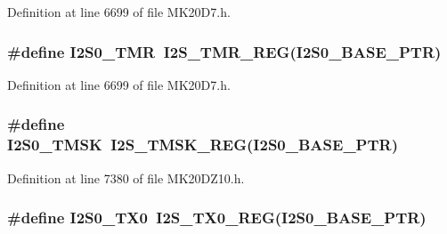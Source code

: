 Definition at line 6699 of file M\+K20\+D7.\+h.

\subsubsection[{\texorpdfstring{I2\+S0\+\_\+\+T\+MR}{I2S0_TMR}}]{\setlength{\rightskip}{0pt plus 5cm}\#define I2\+S0\+\_\+\+T\+MR~{\bf I2\+S\+\_\+\+T\+M\+R\+\_\+\+R\+EG}({\bf I2\+S0\+\_\+\+B\+A\+S\+E\+\_\+\+P\+TR})}\hypertarget{group___i2_s___register___accessor___macros_gadedf7b57a0f8f42bc0d282b45cd749b7}{}\label{group___i2_s___register___accessor___macros_gadedf7b57a0f8f42bc0d282b45cd749b7}


Definition at line 6699 of file M\+K20\+D7.\+h.

\subsubsection[{\texorpdfstring{I2\+S0\+\_\+\+T\+M\+SK}{I2S0_TMSK}}]{\setlength{\rightskip}{0pt plus 5cm}\#define I2\+S0\+\_\+\+T\+M\+SK~{\bf I2\+S\+\_\+\+T\+M\+S\+K\+\_\+\+R\+EG}({\bf I2\+S0\+\_\+\+B\+A\+S\+E\+\_\+\+P\+TR})}\hypertarget{group___i2_s___register___accessor___macros_ga584c9c94eb2f2afb8d0215d5d2250b20}{}\label{group___i2_s___register___accessor___macros_ga584c9c94eb2f2afb8d0215d5d2250b20}


Definition at line 7380 of file M\+K20\+D\+Z10.\+h.

\subsubsection[{\texorpdfstring{I2\+S0\+\_\+\+T\+X0}{I2S0_TX0}}]{\setlength{\rightskip}{0pt plus 5cm}\#define I2\+S0\+\_\+\+T\+X0~{\bf I2\+S\+\_\+\+T\+X0\+\_\+\+R\+EG}({\bf I2\+S0\+\_\+\+B\+A\+S\+E\+\_\+\+P\+TR})}\hypertarget{group___i2_s___register___accessor___macros_ga05e279801e846a027faefbd67b54fc0b}{}\label{group___i2_s___register___accessor___macros_ga05e279801e846a027faefbd67b54fc0b}


